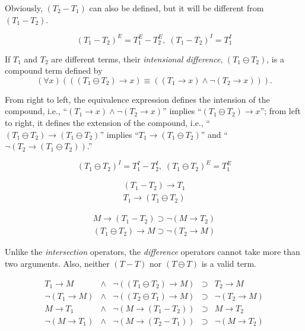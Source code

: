 Obviously, $(T_2 - T_1)$ can also be defined, but it will be different from $(T_1 - T_2)$.
\begin{theo}
\[(T_1 - T_2)^E = T_1^E - T_2^E, \; (T_1-T_2)^I = T_1^I\]
\end{theo}

\begin{defi}
If $T_1$ and $T_2$ are different terms, their {\em intensional difference}, \((T_1 \ominus T_2)\), is a compound term defined by
\[(\forall x) (((T_1 \ominus T_2) \rightarrow x) \equiv ((T_1 \rightarrow x) \wedge \neg(T_2 \rightarrow x))).\]
\end{defi}
From right to left, the equivalence expression defines the intension of the compound, i.e., ``\((T_1 \rightarrow x) \wedge \neg(T_2 \rightarrow x)\)'' implies ``\((T_1 \ominus T_2) \rightarrow x\)''; from left to right, it defines the extension of the compound, i.e., ``\((T_1 \ominus T_2) \rightarrow (T_1 \ominus T_2)\)'' implies ``\(T_1 \rightarrow (T_1 \ominus T_2)\)'' and ``\(\neg(T_2 \rightarrow (T_1 \ominus T_2))\).''

\begin{theo}
\[(T_1 \ominus T_2)^I = T_1^I - T_2^I, \; (T_1 \ominus T_2)^E = T_1^E\]
\end{theo}

\begin{theo}
\[\begin{array}{c}
(T_1 - T_2) \rightarrow T_1 \\
T_1 \rightarrow (T_1 \ominus T_2) 
\end{array}\]
\end{theo}

\begin{theo}
\[\begin{array}{c}
M \rightarrow (T_1 - T_2) \supset \neg(M \rightarrow T_2) \\
(T_1 \ominus T_2) \rightarrow M \supset \neg(T_2 \rightarrow M)
\end{array}\]
\end{theo}

Unlike the \emph{intersection} operators, the \emph{difference} operators cannot take more than two arguments. Also, neither $(T - T)$ nor $(T \ominus T)$ is a valid term.

\begin{theo}
\[\begin{array}{rcrcr}
T_1 \rightarrow M & \wedge & \neg ((T_1 \ominus T_2) \rightarrow M) & \supset & T_2 \rightarrow M \\
\neg (T_1 \rightarrow M) & \wedge & \neg ((T_2 \ominus T_1) \rightarrow M) & \supset & \neg (T_2 \rightarrow M) \\
M \rightarrow T_1 & \wedge & \neg (M \rightarrow (T_1 - T_2)) & \supset & M \rightarrow T_2 \\
\neg (M \rightarrow T_1) & \wedge & \neg (M \rightarrow (T_2 - T_1)) & \supset & \neg (M \rightarrow T_2) \\
\end{array}\]
\end{theo}

